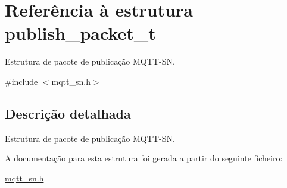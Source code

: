 \hypertarget{structpublish__packet__t}{\section{Referência à estrutura publish\+\_\+packet\+\_\+t}
\label{structpublish__packet__t}
}


Estrutura de pacote de publicação M\+Q\+T\+T-\/\+S\+N.  




{\ttfamily \#include $<$mqtt\+\_\+sn.\+h$>$}



\subsection{Descrição detalhada}
Estrutura de pacote de publicação M\+Q\+T\+T-\/\+S\+N. 

A documentação para esta estrutura foi gerada a partir do seguinte ficheiro\+:\begin{DoxyCompactItemize}
\item 
\hyperlink{mqtt__sn_8h}{mqtt\+\_\+sn.\+h}\end{DoxyCompactItemize}
